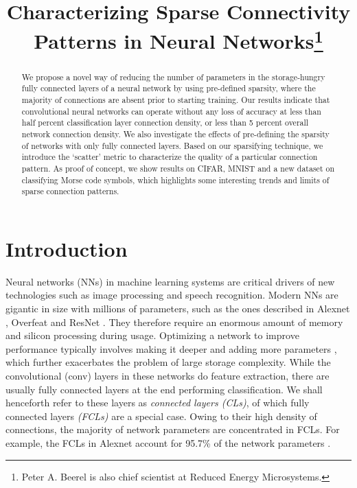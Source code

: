 \documentclass[conference]{IEEEtran}
\begin{document}
\title{Characterizing Sparse Connectivity\\Patterns in Neural Networks\thanks{Peter A. Beerel is also chief scientist at Reduced Energy Microsystems.}}

\author{
}


\maketitle

\begin{abstract}
We propose a novel way of reducing the number of parameters in the storage-hungry fully connected layers of a neural network by using pre-defined sparsity, where the majority of connections are absent prior to starting training. Our results indicate that convolutional neural networks can operate without any loss of accuracy at less than half percent classification layer connection density, or less than 5 percent overall network connection density. We also investigate the effects of pre-defining the sparsity of networks with only fully connected layers. Based on our sparsifying technique, we introduce the `scatter' metric to characterize the quality of a particular connection pattern. As proof of concept, we show results on CIFAR, MNIST and a new dataset on classifying Morse code symbols, which highlights some interesting trends and limits of sparse connection patterns.
\end{abstract}


\section{Introduction}
Neural networks (NNs) in machine learning systems are critical drivers of new technologies such as image processing and speech recognition. Modern NNs are gigantic in size with millions of parameters, such as the ones described in Alexnet \cite{Krizhevsky2012}, Overfeat \cite{Sermanet2013} and ResNet \cite{He2016}. They therefore require an enormous amount of memory and silicon processing during usage. Optimizing a network to improve performance typically involves making it deeper and adding more parameters \cite{Simonyan2015,Szegedy2015,Huang2016}, which further exacerbates the problem of large storage complexity. While the convolutional (conv) layers in these networks do feature extraction, there are usually fully connected layers at the end performing classification. We shall henceforth refer to these layers as \emph{connected layers (CLs)}, of which fully connected layers \emph{(FCLs)} are a special case. Owing to their high density of connections, the majority of network parameters are concentrated in FCLs. For example, the FCLs in Alexnet account for 95.7\% of the network parameters \cite{Zhang2016}.
\end{document}
